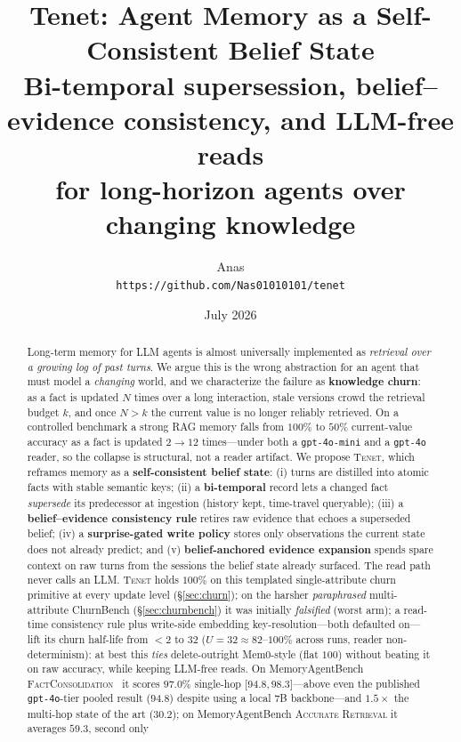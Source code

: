 \documentclass[11pt]{article}
\title{\textbf{Tenet: Agent Memory as a Self-Consistent Belief State}\\
\large Bi-temporal supersession, belief--evidence consistency, and LLM-free reads\\
for long-horizon agents over changing knowledge}
\author{Anas\\\small \texttt{https://github.com/Nas01010101/tenet}}
\date{July 2026}
\newcommand{\tenet}{\textsc{Tenet}}
\newcommand{\ci}[2]{{\footnotesize[#1,\,#2]}}
\begin{document}
\maketitle

\begin{abstract}
\noindent Long-term memory for LLM agents is almost universally implemented as
\emph{retrieval over a growing log of past turns}. We argue this is the wrong abstraction
for an agent that must model a \emph{changing} world, and we characterize the failure as
\textbf{knowledge churn}: as a fact is updated $N$ times over a long interaction, stale
versions crowd the retrieval budget $k$, and once $N>k$ the current value is no longer
reliably retrieved. On a controlled benchmark a strong RAG memory falls from $100\%$ to
$50\%$ current-value accuracy as a fact is updated $2\!\to\!12$ times---under both a
\texttt{gpt-4o-mini} and a \texttt{gpt-4o} reader, so the collapse is structural, not a
reader artifact. We propose \tenet{}, which reframes memory as a \textbf{self-consistent
belief state}: (i) turns are distilled into atomic facts with stable semantic keys;
(ii) a \textbf{bi-temporal} record lets a changed fact \emph{supersede} its predecessor at
ingestion (history kept, time-travel queryable); (iii) a \textbf{belief--evidence
consistency rule} retires raw evidence that echoes a superseded belief; (iv) a
\textbf{surprise-gated write policy} stores only observations the current state does not
already predict; and (v) \textbf{belief-anchored evidence expansion} spends spare context
on raw turns from the sessions the belief state already surfaced. The read path never
calls an LLM. \tenet{} holds $100\%$ on this templated single-attribute churn primitive at
every update level (\S\ref{sec:churn}); on the harsher \emph{paraphrased} multi-attribute
ChurnBench (\S\ref{sec:churnbench}) it was initially \emph{falsified} (worst arm); a
read-time consistency rule plus write-side embedding key-resolution---both defaulted
on---lift its churn half-life from ${<}2$ to $32$ ($U{=}32 \approx 82$--$100\%$ across
runs, reader non-determinism): at best this \emph{ties} delete-outright Mem0-style (flat
$100$) without beating it on raw accuracy, while keeping LLM-free reads. On
MemoryAgentBench \textsc{FactConsolidation}~\cite{mab} it scores $97.0\%$ single-hop
\ci{94.8}{98.3}---above even the published \texttt{gpt-4o}-tier pooled result
($94.8$) despite using a local 7B backbone---and $1.5\times$ the multi-hop state of the art
($30.2$); on MemoryAgentBench \textsc{Accurate Retrieval} it averages $59.3$, second only

\end{abstract}
\end{document}
